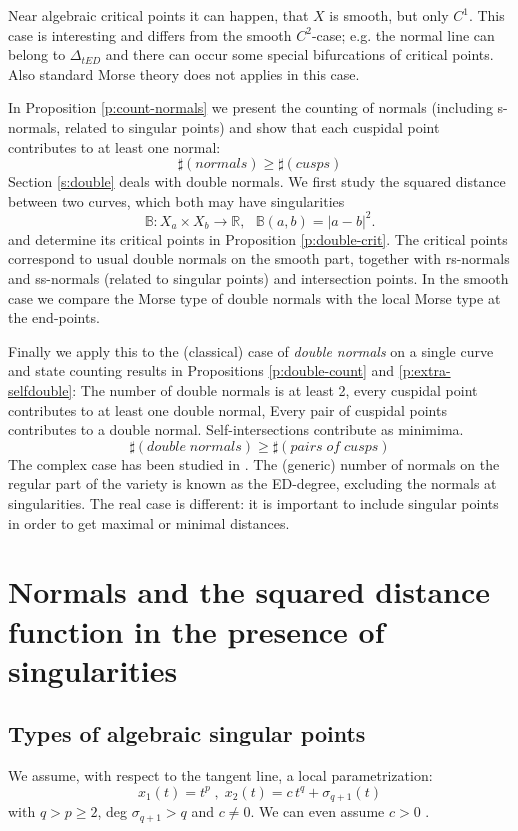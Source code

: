 \documentclass[12pt,a4,twoside]{amsart}
\newtheorem*{main lemma}{The main lemma}
\begin{document}
 Near algebraic critical points it can happen, that $X$ is smooth, but  only $C^1$.  This case  is interesting and differs from the smooth  $C^2$-case; e.g. the normal line can belong to $\Delta_{tED}$ and there can occur some special bifurcations of critical points.  Also standard Morse theory does not applies in this case. 

In Proposition 
\ref{p:count-normals} we present the counting of normals (including s-normals, related to singular points) and show that 
each cuspidal point contributes to at least one normal:
$$ \sharp (normals) \ge \sharp (cusps) $$
Section \ref{s:double} deals with double normals.  We first study the squared distance between two curves, which both may have singularities
$$\mathbb{B}  : X_a \times X_b \rightarrow  \mathbb{R}, \ \ \ \mathbb{B}(a,b)  =|a-b|^2.$$
and determine its critical points in Proposition \ref{p:double-crit}. The critical points correspond to usual double normals on the smooth part, together with rs-normals and ss-normals (related to singular points) and intersection points. In the smooth case we compare the Morse type of double normals with the local Morse type at the end-points.



Finally we apply this to the (classical) case of \textit{double normals} on a single curve and state counting results in Propositions \ref{p:double-count} and \ref{p:extra-selfdouble}: The number of double normals is at least 2, every cuspidal point contributes to at least one double normal, Every pair of cuspidal points contributes to a double normal. Self-intersections contribute  as
 minimima.
$$ \sharp(double \; normals) \ge \sharp (pairs \; of \; cusps)$$
The complex case  has been studied in \cite{JST}. The (generic) number of normals on the regular part of the variety is known as the ED-degree,  excluding the normals at singularities.
The real case is different: it is important to include singular points  in order to get maximal or minimal distances.\\


\section{Normals and the squared distance function in the presence of singularities}

\subsection{Types of algebraic singular points}
We assume, with respect to the tangent line,  a local parametrization:
\begin{equation}\label{e:Puis}
x_1(t) = t ^p \; , \;  x_2(t) = c \,t^q + \sigma_{q+1}(t) 
\end{equation}
with $q >p \ge 2$, deg $\sigma_{q+1} > q$ and $c \ne 0$.
We can even assume $c >0$ .
\end{document}

